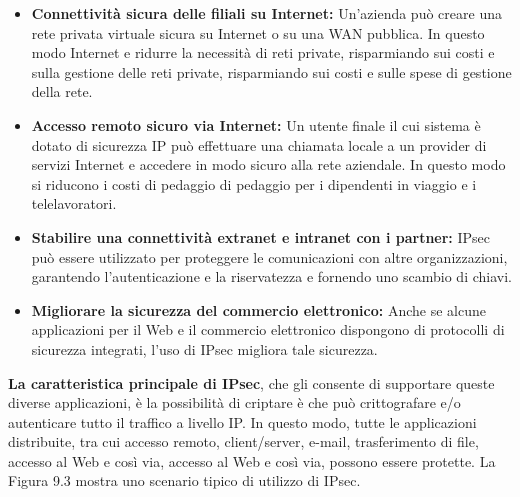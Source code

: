 \begin{itemize}
    \item \textbf{Connettività sicura delle filiali su Internet:} Un'azienda può creare una rete privata virtuale sicura su Internet o su una WAN pubblica. In questo modo Internet e ridurre la necessità di reti private, risparmiando sui costi e sulla gestione delle reti private, risparmiando sui costi e sulle spese di gestione della rete.
    
    \item \textbf{Accesso remoto sicuro via Internet:} Un utente finale il cui sistema è dotato di sicurezza IP può effettuare una chiamata locale a un provider di servizi Internet e accedere in modo sicuro alla rete aziendale. In questo modo si riducono i costi di pedaggio di pedaggio per i dipendenti in viaggio e i telelavoratori.
    
    \item \textbf{Stabilire una connettività extranet e intranet con i partner:} IPsec può essere utilizzato per proteggere le comunicazioni con altre organizzazioni, garantendo l'autenticazione e la riservatezza e fornendo uno scambio di chiavi.
    
    \item \textbf{Migliorare la sicurezza del commercio elettronico:} Anche se alcune applicazioni per il Web e il commercio elettronico dispongono di protocolli di sicurezza integrati, l'uso di IPsec migliora tale sicurezza.
\end{itemize}
\textbf{La caratteristica principale di IPsec}, che gli consente di supportare queste diverse applicazioni, è la possibilità di criptare è che può crittografare e/o autenticare tutto il traffico a livello IP. In questo modo, tutte le
applicazioni distribuite, tra cui accesso remoto, client/server, e-mail, trasferimento di file, accesso al Web e così via, accesso al Web e così via, possono essere protette. La Figura 9.3 mostra uno scenario tipico di utilizzo di IPsec.

\singlespacing


